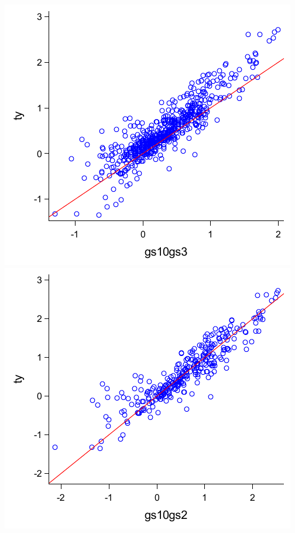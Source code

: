 \documentclass{article}
\begin{document}
\includegraphics{scatter/gs10gs3}\includegraphics{scatter/gs10gs2}
\clearpage
\end{document}
